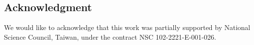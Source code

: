 \documentclass[runningheads,a4paper]{llncs}
\begin{document}
\subsection*{Acknowledgment}  
We would like to acknowledge that this work was partially supported by National Science Council, Taiwan, under the contract NSC 102-2221-E-001-026.
\end{document}
